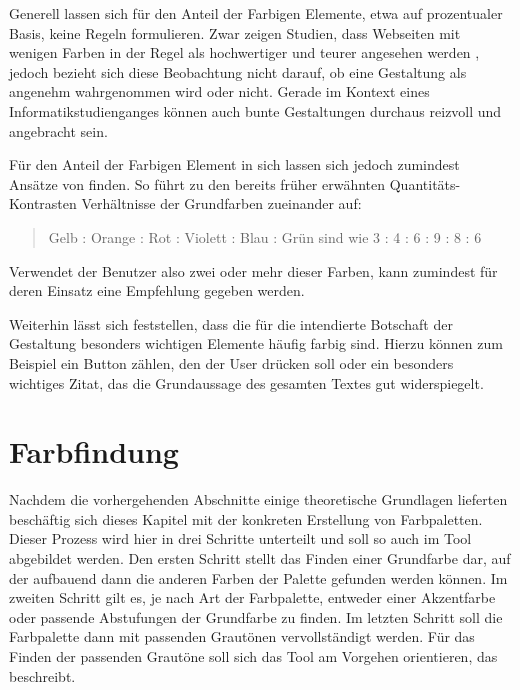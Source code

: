 Generell lassen sich für den Anteil der Farbigen Elemente, etwa auf prozentualer Basis, keine Regeln formulieren. Zwar zeigen Studien, dass Webseiten mit wenigen Farben in der Regel als hochwertiger und teurer angesehen werden \cite{zhang2016makes}, jedoch bezieht sich diese Beobachtung nicht darauf, ob eine Gestaltung als angenehm wahrgenommen wird oder nicht. Gerade im Kontext eines Informatikstudienganges können auch bunte Gestaltungen durchaus reizvoll und angebracht sein.

Für den Anteil der Farbigen Element in sich lassen sich jedoch zumindest Ansätze von finden. So führt \cite[S. 59]{Itten201006} zu den bereits früher erwähnten Quantitäts-Kontrasten Verhältnisse der Grundfarben zueinander auf:

\begin{quote}
Gelb : Orange : Rot : Violett : Blau : Grün
sind wie
3 : 4 : 6 : 9 : 8 : 6
\end{quote}

Verwendet der Benutzer also zwei oder mehr dieser Farben, kann zumindest für deren Einsatz eine Empfehlung gegeben werden.

Weiterhin lässt sich feststellen, dass die für die intendierte Botschaft der Gestaltung besonders wichtigen Elemente häufig farbig sind. Hierzu können zum Beispiel ein Button zählen, den der User drücken soll oder ein besonders wichtiges Zitat, das die Grundaussage des gesamten Textes gut widerspiegelt.


\section{Farbfindung}

Nachdem die vorhergehenden Abschnitte einige theoretische Grundlagen lieferten beschäftig sich dieses Kapitel mit der konkreten Erstellung von Farbpaletten. Dieser Prozess wird hier in drei Schritte unterteilt und soll so auch im Tool abgebildet werden.
Den ersten Schritt stellt das Finden einer Grundfarbe dar, auf der aufbauend dann die anderen Farben der Palette gefunden werden können.
Im zweiten Schritt gilt es, je nach Art der Farbpalette, entweder einer Akzentfarbe oder passende Abstufungen der Grundfarbe zu finden. Im letzten Schritt soll die Farbpalette dann mit passenden Grautönen vervollständigt werden. Für das Finden der passenden Grautöne soll sich das Tool am Vorgehen orientieren, das \cite{elizabeth2016simple} beschreibt.

